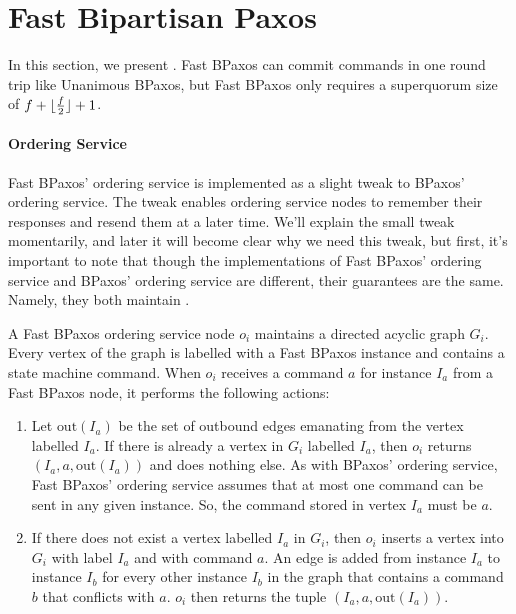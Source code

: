 \section{Fast Bipartisan Paxos}
In this section, we present . Fast BPaxos can
commit commands in one round trip like Unanimous BPaxos, but Fast BPaxos only
requires a superquorum size of $f + \lfloor\frac{f}{2}\rfloor + 1$.

\paragraph{Ordering Service}
Fast BPaxos' ordering service is implemented as a slight tweak to BPaxos'
ordering service. The tweak enables ordering service nodes to remember their
responses and resend them at a later time. We'll explain the small tweak
momentarily, and later it will become clear why we need this tweak, but first,
it's important to note that though the implementations of Fast BPaxos' ordering
service and BPaxos' ordering service are different, their guarantees are the
same. Namely, they both maintain .

\newcommand{\out}{\text{out}}
A Fast BPaxos ordering service node $o_i$ maintains a directed acyclic graph
$G_i$. Every vertex of the graph is labelled with a Fast BPaxos instance and
contains a state machine command. When $o_i$ receives a command $a$ for
instance $I_a$ from a Fast BPaxos node, it performs the following actions:
\begin{enumerate}
  \item
    Let $\out(I_a)$ be the set of outbound edges emanating from the vertex
    labelled $I_a$. If there is already a vertex in $G_i$ labelled $I_a$,
    then $o_i$ returns $(I_a, a, \out(I_a))$ and does nothing else. As with
    BPaxos' ordering service, Fast BPaxos' ordering service assumes that at
    most one command can be sent in any given instance. So, the command stored
    in vertex $I_a$ must be $a$.
  \item
    If there does not exist a vertex labelled $I_a$ in $G_i$, then $o_i$
    inserts a vertex into $G_i$ with label $I_a$ and with command $a$. An edge
    is added from instance $I_a$ to instance $I_b$ for every other instance
    $I_b$ in the graph that contains a command $b$ that conflicts with $a$.
    $o_i$ then returns the tuple $(I_a, a, \out(I_a))$.
\end{enumerate}

